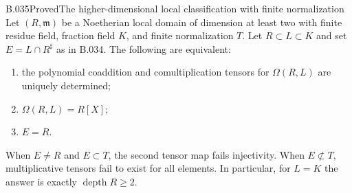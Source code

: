 \begin{saresult}{B.035}{Proved}{The higher-dimensional local classification with finite normalization}
Let $(R,\mathfrak m)$ be a Noetherian local domain of dimension
at least two with finite residue field, fraction field $K$, and
finite normalization $T$. Let $R\subset L\subset K$ and set
$E=L\cap R^\sharp$ as in B.034. The following are equivalent:
\begin{enumerate}
\item the polynomial coaddition and comultiplication tensors
for $\Omega(R,L)$ are uniquely determined;
\item $\Omega(R,L)=R[X]$;
\item $E=R$.
\end{enumerate}
When $E\ne R$ and $E\subset T$, the second tensor map fails
injectivity. When $E\not\subset T$, multiplicative tensors fail
to exist for all elements. In particular, for $L=K$ the answer
is exactly $\operatorname{depth}R\ge2$.
\end{saresult}
